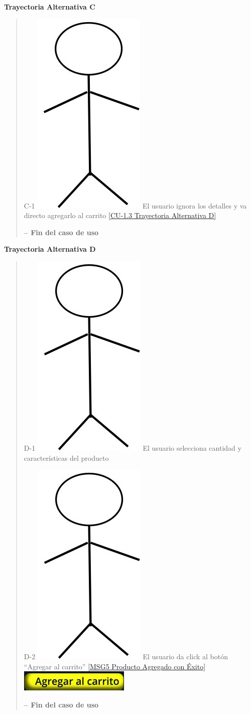 \documentclass[14pt]{article}
\begin{document}
                \vspace{0.5cm}\textbf{Trayectoria Alternativa C}\label{CU-1.3 Trayectoria Alternativa C}
                    \begin{quote}
                        \item C-1  \includegraphics[height=0.02\textwidth]{Actor.jpg}
                            \label{Actor} El usuario ignora los detalles y va directo agregarlo al carrito \ref{CU-1.3 Trayectoria Alternativa D}
                        
                        \vspace{0.3cm}\textbf{-- Fin del caso de uso}
                    \end{quote}
                
                \vspace{0.5cm}\textbf{Trayectoria Alternativa D}\label{CU-1.3 Trayectoria Alternativa D}
                    \begin{quote}
                        \item D-1  \includegraphics[height=0.02\textwidth]{Actor.jpg}
                            \label{Actor} El usuario selecciona cantidad y características del producto
                        \item D-2  \includegraphics[height=0.02\textwidth]{Actor.jpg}
                            \label{Actor} El usuario da click al botón “Agregar al carrito” \ref{MSG5 Producto Agregado con Éxito}
                        \includegraphics[height=0.02\textwidth]{BotonAgregarAlCarrito.jpg}
                        \label{BotonAgregarAlCarrito}
                        
                        \vspace{0.3cm}\textbf{-- Fin del caso de uso}
                    \end{quote}
                     
\end{document}
